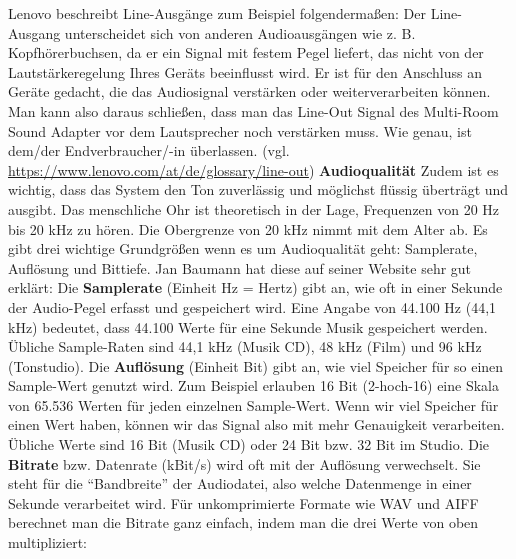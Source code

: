 \documentclass[]{article}
\begin{document}
Lenovo beschreibt Line-Ausgänge zum Beispiel folgendermaßen: \glqq Der Line-Ausgang unterscheidet sich von anderen Audioausgängen wie z. B. Kopfhörerbuchsen, da er ein Signal mit festem Pegel liefert, das nicht von der Lautstärkeregelung Ihres Geräts beeinflusst wird. Er ist für den Anschluss an Geräte gedacht, die das Audiosignal verstärken oder weiterverarbeiten können.\grqq{} \newline
Man kann also daraus schließen, dass man das Line-Out Signal des Multi-Room Sound Adapter vor dem Lautsprecher noch verstärken muss. Wie genau, ist dem/der Endverbraucher/-in überlassen.
\vspace{4mm} \newline
(vgl. \url{https://www.lenovo.com/at/de/glossary/line-out})
\vspace{4mm}\newline
\textbf{Audioqualität}\newline
Zudem ist es wichtig, dass das System den Ton zuverlässig und möglichst flüssig überträgt und ausgibt.\newline
\glqq Das menschliche Ohr ist theoretisch in der Lage, Frequenzen von 20 Hz bis 20 kHz zu hören. Die
Obergrenze von 20 kHz nimmt mit dem Alter ab. \grqq{} \newline
Es gibt drei wichtige Grundgrößen wenn es um Audioqualität geht: Samplerate, Auflösung und Bittiefe. Jan Baumann hat diese auf seiner Website sehr gut erklärt:
\vspace{4mm}\newline
\glqq Die \textbf{Samplerate} (Einheit Hz = Hertz) gibt an, wie oft in einer Sekunde der Audio-Pegel erfasst und gespeichert wird. Eine Angabe von 44.100 Hz (44,1 kHz) bedeutet, dass 44.100 Werte für eine Sekunde Musik gespeichert werden. Übliche Sample-Raten sind 44,1 kHz (Musik CD), 48 kHz (Film) und 96 kHz (Tonstudio). \grqq{}
\vspace{4mm}\newline
\glqq Die \textbf{Auflösung} (Einheit Bit) gibt an, wie viel Speicher für so einen Sample-Wert genutzt wird. Zum Beispiel erlauben 16 Bit (2-hoch-16) eine Skala von 65.536 Werten für jeden einzelnen Sample-Wert. Wenn wir viel Speicher für einen Wert haben, können wir das Signal also mit mehr Genauigkeit verarbeiten. Übliche Werte sind 16 Bit (Musik CD) oder 24 Bit bzw. 32 Bit im Studio.\grqq{}
\vspace{4mm}\newline
\glqq Die \textbf{Bitrate} bzw. Datenrate (kBit/s) wird oft mit der Auflösung verwechselt. Sie steht für die “Bandbreite” der Audiodatei, also welche Datenmenge in einer Sekunde verarbeitet wird. Für unkomprimierte Formate wie WAV und AIFF berechnet man die Bitrate ganz einfach, indem man die drei Werte von oben multipliziert: \grqq{}\newline
\end{document}
